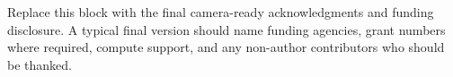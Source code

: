 \begin{ack}
Replace this block with the final camera-ready acknowledgments and funding disclosure. A typical
final version should name funding agencies, grant numbers where required, compute support, and any
non-author contributors who should be thanked.
\end{ack}
